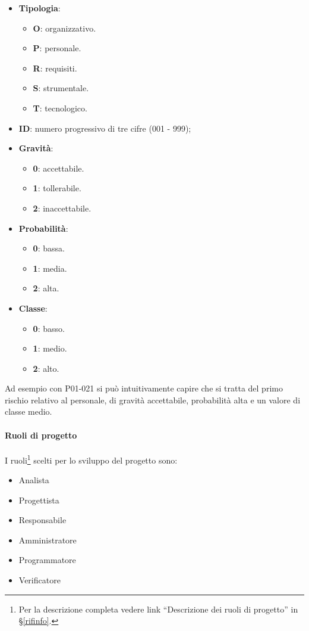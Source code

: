 			\begin{itemize}
				\item \textbf{Tipologia}:
				\begin{itemize}
					\item \textbf{O}: organizzativo.
					\item \textbf{P}: personale.
					\item \textbf{R}: requisiti.
					\item \textbf{S}: strumentale.
					\item \textbf{T}: tecnologico.
				\end{itemize}
				
				\item \textbf{ID}: numero progressivo di tre cifre (001 - 999);
				\item \textbf{Gravità}:
				\begin{itemize}
					\item \textbf{0}: accettabile.
					\item \textbf{1}: tollerabile.
					\item \textbf{2}: inaccettabile.
				\end{itemize}
				
				\item \textbf{Probabilità}:
				\begin{itemize}
					\item \textbf{0}: bassa.
					\item \textbf{1}: media.
					\item \textbf{2}: alta.
				\end{itemize}
				
				\item \textbf{Classe}:
				\begin{itemize}
					\item \textbf{0}: basso.
					\item \textbf{1}: medio.
					\item \textbf{2}: alto.
				\end{itemize}
			\end{itemize}
			
			Ad esempio con P01-021 si può intuitivamente capire che si tratta del primo rischio relativo al personale, di gravità accettabile, probabilità alta e un valore di classe medio.
			
			\paragraph{Ruoli di progetto}
			I ruoli\footnote{Per la descrizione completa vedere link ``Descrizione dei ruoli di progetto'' in \S\ref{rifinfo}.} scelti per lo sviluppo del progetto sono:
			\begin{itemize}[noitemsep]
				\item Analista
				\item Progettista
				\item Responsabile
				\item Amministratore
				\item Programmatore
				\item Verificatore
			\end{itemize}

